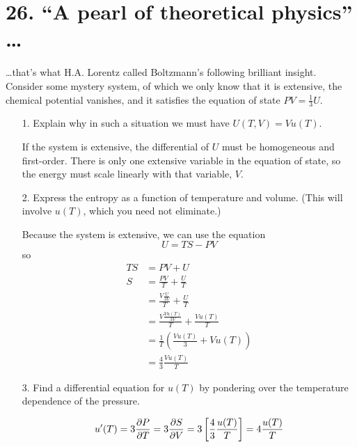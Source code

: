 \documentclass[a4paper,twoside]{article}
\begin{document}
\section*{26. ``A pearl of theoretical physics'' \ldots}
\ldots that's what H.A. Lorentz called Boltzmann's following brilliant insight. Consider some mystery system, of which we only know that it is extensive, the chemical potential vanishes, and it satisfies the equation of state $ PV = \frac{1}{3} U $.
\begin{itemize}
    \item[1.] Explain why in such a situation we must have $ U(T,V) = V u(T) $.
        \begin{problem}
            If the system is extensive, the differential of $ U $ must be homogeneous and first-order. There is only one extensive variable in the equation of state, so the energy must scale linearly with that variable, $ V $.
        \end{problem}
    \item[2.] Express the entropy as a function of temperature and volume. (This will involve $ u(T) $, which you need not eliminate.)
        \begin{problem}
            Because the system is extensive, we can use the equation
            \begin{equation}
                U = TS - PV
            \end{equation}
            so
            \begin{align}
                TS &= PV + U \\
                S &= \frac{PV}{T} + \frac{U}{T} \\
                &= \frac{V \frac{U}{3V}}{T} + \frac{U}{T} \\
                &= \frac{V \frac{Vu(T)}{3V}}{T} + \frac{Vu(T)}{T} \\
                &= \frac{1}{T} \left( \frac{V u(T)}{3} + V u(T) \right) \\
                &= \frac{4}{3} \frac{V u(T)}{T} 
            \end{align}
        \end{problem}
    \item[3.] Find a differential equation for $ u(T) $ by pondering over the temperature dependence of the pressure.
        \begin{problem}
            \begin{equation}
                u'(T) = 3 \pdv{P}{T} = 3 \pdv{S}{V} = 3 \left[ \frac{4}{3} \frac{u(T)}{T} \right] = 4 \frac{u(T)}{T}

\end{equation}
\end{problem}
\end{itemize}
\end{document}
